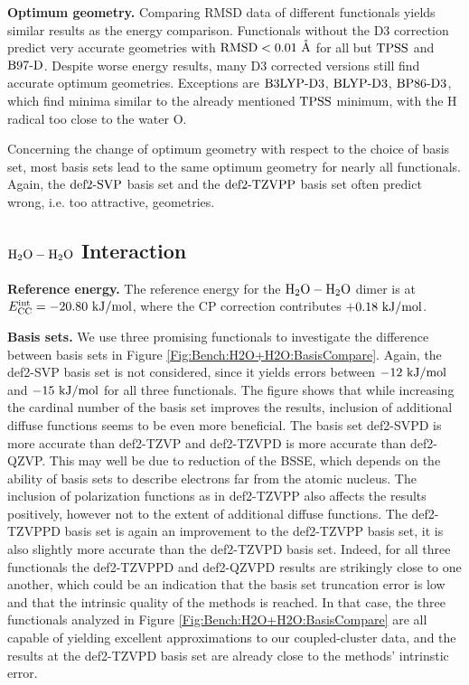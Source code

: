 \textbf{Optimum geometry.} Comparing RMSD data of different functionals yields similar results as the energy comparison.
Functionals without the D3 correction
predict very accurate geometries with \mbox{$\text{RMSD} < 0.01\ \mathring{\text{A}}$} for all but
$\text{TPSS}$ and $\text{B97-D}$.
Despite worse energy results, many D3 corrected versions still find accurate optimum geometries.
Exceptions are $\text{B3LYP}\text{-D3}$, $\text{BLYP}\text{-D3}$, $\text{BP86}\text{-D3}$, which find minima similar
to the already mentioned $\text{TPSS}$ minimum, with the H radical too close to the
water O.

Concerning the change of optimum geometry with respect to the choice of basis
set, most basis sets lead to the same optimum geometry for nearly all
functionals. Again, the \mbox{$\text{def2-SVP}$} basis set and the $\text{def2-TZVPP}$ basis set often
predict wrong, i.e. too attractive, geometries. 




\subsection{$\mbox{\ensuremath{\text H _2 \text O-\text H _2 \text O}}$ Interaction}


\textbf{Reference energy.} The reference energy for the $\mbox{\ensuremath{\text H _2 \text O-\text H _2 \text O}}$ dimer is at
\mbox{$E^{\text{int}}_{\text {CC}}=-20.80\ \text {kJ/mol}$}, where the CP correction contributes $+0.18\ \text {kJ/mol}$.

\textbf{Basis sets.} We use three promising functionals to investigate the difference
between basis sets in Figure \ref{Fig:Bench:H2O+H2O:BasisCompare}. Again, the
def2-SVP basis set is not considered, since it yields errors between $-12\ \text {kJ/mol}$ and $-15\ \text {kJ/mol}$ for all three
functionals. The figure shows that while increasing the cardinal number of the
basis set improves the results, inclusion of additional diffuse functions seems to
be even more beneficial. The basis set def2-SVPD is more accurate than def2-TZVP and
def2-TZVPD is more accurate than def2-QZVP.
This may well be due to reduction of the BSSE, which depends on the ability
of basis sets to describe electrons far from the atomic nucleus.
The inclusion of polarization functions as in def2-TZVPP also
affects the results positively, however not to the extent of additional
diffuse functions. The def2-TZVPPD basis set is again an improvement
to the def2-TZVPP basis set, it is also slightly more accurate than the
def2-TZVPD basis set. Indeed, for all three functionals the def2-TZVPPD and
def2-QZVPD results are strikingly close to one another, which could
be an indication that the basis set truncation error is low and that
the intrinsic quality of the methods is reached. In that case, the
three functionals analyzed in Figure \ref{Fig:Bench:H2O+H2O:BasisCompare} are
all capable of yielding excellent approximations to our coupled-cluster data,
and the results at the def2-TZVPD basis set are already close to the
methods' intrinstic error.  

